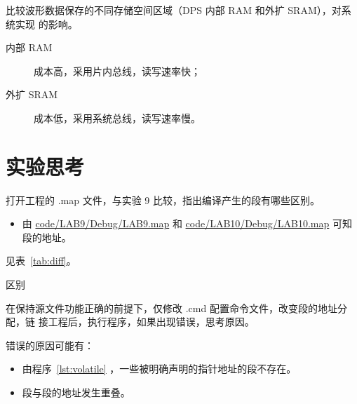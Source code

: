 \documentclass[../main]{subfiles}
\begin{document}
\begin{Exercise}
  比较波形数据保存的不同存储空间区域（DPS 内部 RAM 和外扩 SRAM），对系统实现
  的影响。
\end{Exercise}

\begin{Answer}
  \begin{description}
    \item[内部 RAM]成本高，采用片内总线，读写速率快；
    \item[外扩 SRAM]成本低，采用系统总线，读写速率慢。
  \end{description}
\end{Answer}

\section{实验思考}%
\label{sec:\arabic{chapter}thought}

\begin{Exercise}
  打开工程的 .map 文件，与实验 9 比较，指出编译产生的段有哪些区别。
\end{Exercise}

\begin{Answer}
  \begin{itemize}
    \item 由 \url{code/LAB9/Debug/LAB9.map} 和
      \url{code/LAB10/Debug/LAB10.map} 可知段的地址。
  \end{itemize}
  见表~\ref{tab:diff}。
\end{Answer}

\begin{table}[htbp]
  \centering
  \caption{区别}%
  \label{tab:diff}
  \tiny
\end{table}

\begin{Exercise}
  在保持源文件功能正确的前提下，仅修改 .cmd 配置命令文件，改变段的地址分配，链
  接工程后，执行程序，如果出现错误，思考原因。
\end{Exercise}

\begin{Answer}
  错误的原因可能有：

  \begin{itemize}
    \item 由程序~\ref{lst:volatile} ，一些被明确声明的指针地址的段不存在。
    \item 段与段的地址发生重叠。
  \end{itemize}
\end{Answer}
\end{document}
